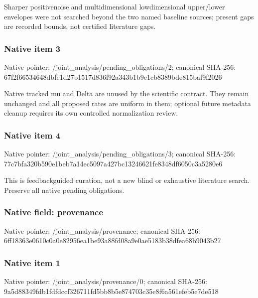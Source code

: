 \documentclass[10pt,a4paper]{article}
\begin{document}
Sharper positivenoise and multidimensional lowdimensional upper/lower envelopes were not searched beyond the two named baseline sources; present gaps are recorded bounds, not certified literature gaps.


\subsubsection{Native item 3}


Native pointer: /joint\_analysis/pending\_obligations/2; canonical SHA-256: 67f2f66534648dbfe1d27b15\allowbreak{}17d836f92a343b1b9e1cb838\allowbreak{}9bde815baf9f2026


Native tracked mu and Delta are unused by the scientific contract. They remain unchanged and all proposed rates are uniform in them; optional future metadata cleanup requires its own controlled normalization review.


\subsubsection{Native item 4}


Native pointer: /joint\_analysis/pending\_obligations/3; canonical SHA-256: 77c7bfa320b590e1beb7a14e\allowbreak{}c5097a427bc13246621fe834\allowbreak{}8df6050c3a5280e6


This is feedbackguided curation, not a new blind or exhaustive literature search. Preserve all native pending obligations.


\subsubsection{Native field: provenance}


Native pointer: /joint\_analysis/provenance; canonical SHA-256: 6ff18363e0610c0a0e82956e\allowbreak{}a1be93a88fd08a9e0ae5183b\allowbreak{}38dfea68b9043b27



\subsubsection{Native item 1}


Native pointer: /joint\_analysis/provenance/0; canonical SHA-256: 9a5d88349fdb1fdfdccf3267\allowbreak{}11fd5bb8b5e874703c35e8f6\allowbreak{}a561efeb5e7de518
\end{document}
